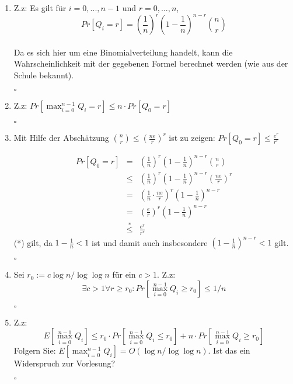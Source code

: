 \documentclass[11pt,a4paper,ngerman]{article}
\begin{document}
\begin{enumerate}[\bfseries a)]

\item Z.z: Es gilt für $i = 0, ..., n - 1$ und $r = 0, ...,n$,
$$ Pr[Q_i = r] = \left( \frac{1}{n} \right)^r \left(1-  \frac{1}{n} \right)^{n-r} \binom{n}{r}$$
\\
Da es sich hier um eine Binomialverteilung handelt, kann die Wahrscheinlichkeit mit der gegebenen Formel berechnet werden (wie aus der Schule bekannt).

\mbox{}\hfill $\square$

\item Z.z: $ Pr[\max_{i=0}^{n-1} Q_i = r] \leq n \cdot Pr[Q_0 = r] $ 



\mbox{}\hfill $\square$

\item Mit Hilfe der Abschätzung $\binom{n}{r} \leq \left( \frac{ne}{r} \right)^r$ ist zu zeigen: $ Pr[Q_0 = r] \leq \frac{e^r}{r^r} $

$$ 
\begin{array}{lcl}
Pr[Q_0 = r] & = & \left( \frac{1}{n} \right)^r \left(1-  \frac{1}{n} \right)^{n-r} \binom{n}{r} \\
 & \leq & \left( \frac{1}{n} \right)^r \left(1-  \frac{1}{n} \right)^{n-r} \left( \frac{ne}{r} \right)^r \\
 & = & \left( \frac{1}{n} \cdot \frac{ne}{r} \right)^r \left(1-  \frac{1}{n} \right)^{n-r} \\
 & = & \left( \frac{e}{r} \right)^r \left(1-  \frac{1}{n} \right)^{n-r} \\
 & \stackrel{*}{\leq} & \frac{e^r}{r^r}
\end{array}
$$
(*) gilt, da $1 - \frac{1}{n} < 1$ ist und damit auch insbesondere $\left(1-  \frac{1}{n} \right)^{n-r} < 1$ gilt.

\mbox{}\hfill $\square$

\item Sei $r_0 := c \log n / \log \log n $ für ein $c > 1$. Z.z:
$$ \exists c > 1 \forall r \geq r_0 : Pr[\max_{i=0}^{n-1} Q_i \geq r_0] \leq 1/n $$

\mbox{}\hfill $\square$

\item Z.z: 
$$ E[\max_{i=0}^{n-1} Q_i] \leq r_0 \cdot Pr[\max_{i=0}^{n-1} Q_i \leq r_0] + n \cdot Pr[\max_{i=0}^{n-1} Q_i \geq r_0] $$
Folgern Sie: $E[\max_{i=0}^{n-1} Q_i] = O(\log n / \log \log n)$. Ist das ein Widerspruch zur Vorlesung?

\mbox{}\hfill $\square$
\end{enumerate}
\end{document}
